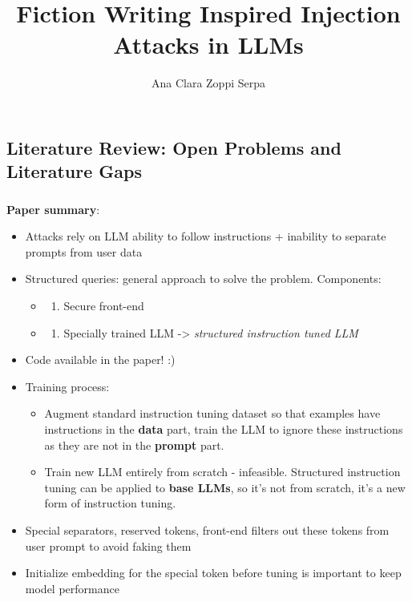 \documentclass[
  letterpaper,
  DIV=11,
  numbers=noendperiod]{scrartcl}
\title{Fiction Writing Inspired Injection Attacks in LLMs}
\author{Ana Clara Zoppi Serpa}
\date{}
\providecommand{\tightlist}{%
  \setlength{\itemsep}{0pt}\setlength{\parskip}{0pt}}
\begin{document}
\maketitle


\subsection{Literature Review: Open Problems and Literature
Gaps}\label{literature-review-open-problems-and-literature-gaps}

\subsubsection{\texorpdfstring{\autocite{ChenPS025_StruQ}}{{[}@ChenPS025\_StruQ{]}}}\label{chenps025_struq}

\textbf{Paper summary}:

\begin{itemize}
\tightlist
\item
  Attacks rely on LLM ability to follow instructions + inability to
  separate prompts from user data
\item
  Structured queries: general approach to solve the problem. Components:

  \begin{itemize}
  \tightlist
  \item
    \begin{enumerate}
    \def\labelenumi{(\arabic{enumi})}
    \tightlist
    \item
      Secure front-end
    \end{enumerate}
  \item
    \begin{enumerate}
    \def\labelenumi{(\arabic{enumi})}
    \setcounter{enumi}{1}
    \tightlist
    \item
      Specially trained LLM -\textgreater{} \emph{structured instruction
      tuned LLM}
    \end{enumerate}
  \end{itemize}
\item
  Code available in the paper! :)
\item
  Training process:

  \begin{itemize}
  \tightlist
  \item
    Augment standard instruction tuning dataset so that examples have
    instructions in the \textbf{data} part, train the LLM to ignore
    these instructions as they are not in the \textbf{prompt} part.
  \item
    Train new LLM entirely from scratch - infeasible. Structured
    instruction tuning can be applied to \textbf{base LLMs}, so it's not
    from scratch, it's a new form of instruction tuning.
  \end{itemize}
\item
  Special separators, reserved tokens, front-end filters out these
  tokens from user prompt to avoid faking them
\item
  Initialize embedding for the special token before tuning is important
  to keep model performance
\end{itemize}
\end{document}
